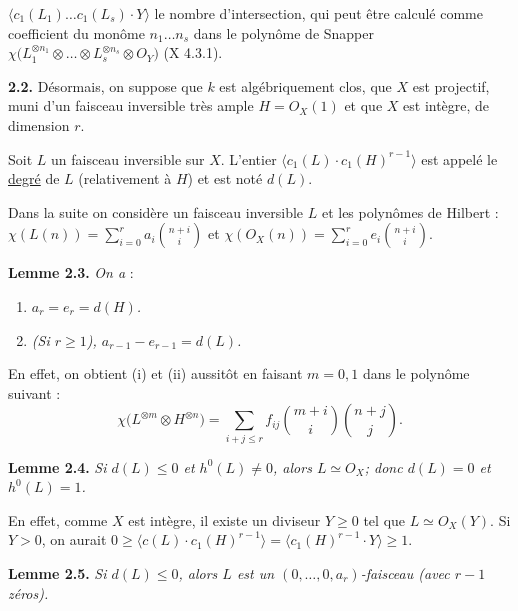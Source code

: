 
\(\langle c_1(L_1)\ldots c_1(L_s)\cdot Y\rangle\) le nombre d'intersection, qui peut être calculé comme coefficient du monôme \(n_1\ldots n_s\) dans le polynôme de Snapper \(\chi\bigl(L_1^{\otimes n_1}\otimes\ldots\otimes L_s^{\otimes n_s}\otimes{O}_Y\bigr)\) (X 4.3.1).

\textbf{2.2.} Désormais, on suppose que \(k\) est algébriquement clos, que \(X\) est projectif, muni d'un faisceau inversible très ample \(H={O}_X(1)\) et que \(X\) est intègre, de dimension \(r\).

Soit \(L\) un faisceau inversible sur \(X\). L'entier \(\langle c_1(L)\cdot c_1(H)^{r-1}\rangle\) est appelé le \uline{degré} de \(L\) (relativement à \(H\)) et est noté \(d(L)\).

Dans la suite on considère un faisceau inversible \(L\) et les polynômes de Hilbert : \(\chi(L(n))=\sum_{i=0}^{r}a_i\binom{n+i}{i}\) et \(\chi({O}_X(n))=\sum_{i=0}^{r}e_i\binom{n+i}{i}\).

\textbf{Lemme 2.3.} \emph{On a} :
\begin{enumerate}[label=(\roman*)]
\item \emph{\(a_r=e_r=d(H)\).}
\item \emph{(Si \(r\ge1\)), \(a_{r-1}-e_{r-1}=d(L)\).}
\end{enumerate}

En effet, on obtient (i) et (ii) aussitôt en faisant \(m=0,1\) dans le polynôme suivant :
\[
\chi\bigl(L^{\otimes m}\otimes H^{\otimes n}\bigr)
=
\sum_{i+j\le r} f_{ij}\binom{m+i}{i}\binom{n+j}{j}.
\]

\textbf{Lemme 2.4.} \emph{Si \(d(L)\le0\) et \(h^0(L)\ne0\), alors \(L\simeq{O}_X\); donc \(d(L)=0\) et \(h^0(L)=1\).}

En effet, comme \(X\) est intègre, il existe un diviseur \(Y\ge0\) tel que \(L\simeq{O}_X(Y)\). Si \(Y>0\), on aurait \(0\ge\langle c(L)\cdot c_1(H)^{r-1}\rangle=\langle c_1(H)^{r-1}\cdot Y\rangle\ge1\).

\textbf{Lemme 2.5.} \emph{Si \(d(L)\le0\), alors \(L\) est un \((0,\ldots,0,a_r)\)-faisceau (avec \(r-1\) zéros).}

